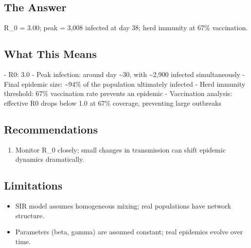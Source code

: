 \documentclass[11pt, a4paper]{article}
\begin{document}
\subsection{The Answer}

\begin{polyainsight}[title={Bottom Line}]
R\_0 = 3.00; peak = 3,008 infected at day 38; herd immunity at 67\% vaccination.
\end{polyainsight}

\subsection{What This Means}

- R0: 3.0
- Peak infection: around day \textasciitilde{}30, with \textasciitilde{}2,900 infected simultaneously
- Final epidemic size: \textasciitilde{}94\% of the population ultimately infected
- Herd immunity threshold: 67\% vaccination rate prevents an epidemic
- Vaccination analysis: effective R0 drops below 1.0 at 67\% coverage, preventing large outbreaks



\subsection{Recommendations}

\begin{enumerate}
  \item Monitor R\_0 closely; small changes in transmission can shift epidemic dynamics dramatically.
\end{enumerate}

\subsection{Limitations}

\begin{polyawarnbox}
\begin{itemize}
  \item SIR model assumes homogeneous mixing; real populations have network structure.
  \item Parameters (beta, gamma) are assumed constant; real epidemics evolve over time.
\end{itemize}
\end{polyawarnbox}

\end{document}
